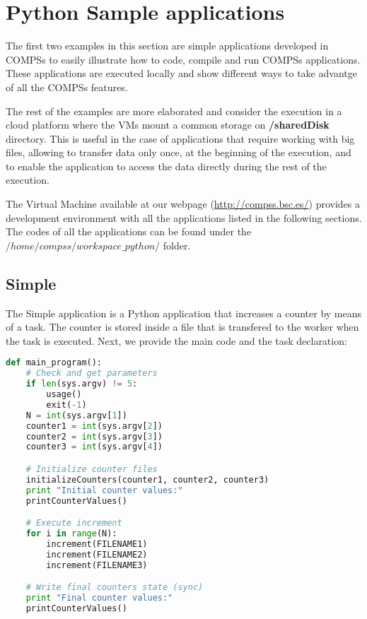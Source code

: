 \section{Python Sample applications}
\label{sec:PythonSampleApps}

The first two examples in this section are simple applications developed in COMPSs to easily illustrate how to code,
compile and run COMPSs applications. These applications are executed locally and show different ways to take advantge
of all the COMPSs features. 

The rest of the examples are more elaborated and consider the execution in a cloud platform where the VMs mount a common 
storage on \textbf{/sharedDisk} directory. This is useful in the case of applications that require working 
with big files, allowing to transfer data only once, at the beginning of the execution, and to enable 
the application to access the data directly during the rest of the execution.

The Virtual Machine available at our webpage (\url{http://compss.bsc.es/}) provides a development environment with
all the applications listed in the following sections. The codes of all the applications can be found under the 
$/home/compss/workspace\_python/$ folder. 

\subsection{Simple}
The Simple application is a Python application that increases a counter by means of a task. The counter is stored inside a file that 
is transfered to the worker when the task is executed. Next, we provide the main code and the task declaration:

\begin{lstlisting}[language=python]
def main_program():
    # Check and get parameters
    if len(sys.argv) != 5:
        usage()
        exit(-1)
    N = int(sys.argv[1])
    counter1 = int(sys.argv[2])
    counter2 = int(sys.argv[3])
    counter3 = int(sys.argv[4])

    # Initialize counter files
    initializeCounters(counter1, counter2, counter3)
    print "Initial counter values:"
    printCounterValues()

    # Execute increment
    for i in range(N):
        increment(FILENAME1)
        increment(FILENAME2)
        increment(FILENAME3)

    # Write final counters state (sync)
    print "Final counter values:"
    printCounterValues()
\end{lstlisting}


